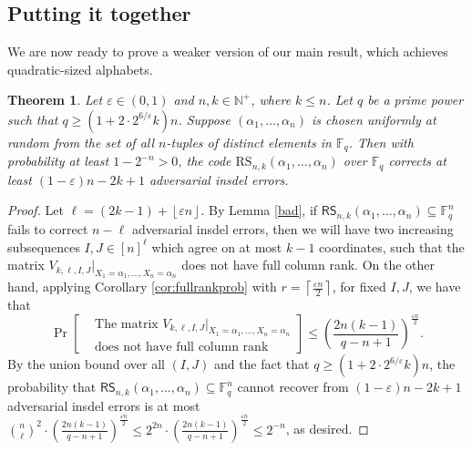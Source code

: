 \documentclass[11pt]{article}
\theoremstyle{plain}
\newtheorem{thm}{Theorem}
\theoremstyle{definition}
\theoremstyle{remark}
\newcommand{\N}{\mathbb{N}}
\newcommand{\F}{\mathbb{F}}
\newcommand{\floor}[1]{\left\lfloor #1 \right\rfloor}
\renewcommand{\epsilon}{\varepsilon}
\newcommand{\Fq}{\mathbb{F}_q}
\begin{document}
\subsection{Putting it together}
We are now ready to prove a weaker version of our main result, which achieves quadratic-sized alphabets.
\begin{thm}\label{m1}
Let $\varepsilon\in (0,1)$ and $n,k\in\N^+$, where $k\leq n$.  
Let $q$ be a prime power such that $q\geq \left(1+2\cdot 2^{6/\epsilon}k\right)n$. 
Suppose $(\alpha_1,\dots,\alpha_n)$ is chosen uniformly at random from the set of all $n$-tuples of distinct elements in $\F_q$.
Then with probability at least $1-2^{-n}>0$, the code $\text{RS}_{n,k}(\alpha_1, \ldots, \alpha_n)$ over $\Fq$ corrects at least $(1-\epsilon)n-2k+1$ adversarial insdel errors.
\end{thm}
\begin{proof}
Let $\ell=(2k-1) + \floor{\varepsilon n}$. 
By Lemma \ref{bad}, if $\mathsf{RS}_{n,k}(\alpha_1,\dots,\alpha_n)\subseteq\F_q^n$ fails to correct $n-\ell$  adversarial insdel errors, then we will have two increasing subsequences $I,J\in[n]^{\ell}$ which agree on at most $k-1$ coordinates, such that the matrix $V_{k,\ell,I, J}|_{X_{1}=\alpha_{1},\dots,X_{n}=\alpha_{n}}$ does not have full column rank. On the other hand, applying Corollary \ref{cor:fullrankprob} with $r=\left\lceil\frac{\varepsilon n}{2}\right\rceil$, for fixed $I,J$, we have that
\[\Pr\left[\begin{aligned}
    &\text{The matrix }V_{k,\ell,I,J}|_{X_1=\alpha_1,\dots,X_{n}=\alpha_{n}}\\
&\text{does not have full column rank}
\end{aligned}\right]\leq 
\left(\frac{2n(k-1)}{q-n+1}\right)^{\frac{\epsilon n}{2}}.\]
By the union bound over all $(I,J)$ and the fact that $q\ge \left(1+2\cdot 2^{6/\epsilon}k\right)n$, 
the probability that $\mathsf{RS}_{n,k}(\alpha_1,\dots,\alpha_n)\subseteq\F_q^n$ cannot recover from $(1-\epsilon)n-2k+1$ adversarial insdel errors is at most $\binom{n}{\ell}^2\cdot \left(\frac{2n(k-1)}{q-n+1}\right)^{\frac{\epsilon n}{2}}\leq 2^{2n}\cdot\left(\frac{2n(k-1)}{q-n+1}\right)^{\frac{\epsilon n}{2}}\leq2^{-n}$, as desired. 
\end{proof}
\end{document}
